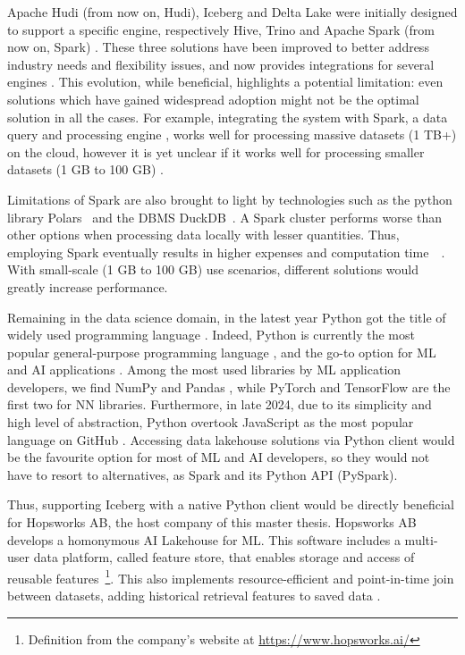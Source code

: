 Apache Hudi (from now on, Hudi), Iceberg and Delta Lake were initially designed to support a specific engine, respectively Hive, Trino and Apache Spark (from now on, Spark) \cite{ApacheHudiVs}. These three solutions have been improved to better address industry needs and flexibility issues, and now provides integrations for several engines \cite{OngoingEvolutionTableFormat}. This evolution, while beneficial, highlights a potential limitation: even solutions which have gained widespread adoption might not be the optimal solution in all the cases. For example, integrating the system with Spark, a data query and processing engine \cite{zahariaApacheSparkUnified2016}, works well for processing massive datasets (1 TB+) on the cloud, however it is yet unclear if it works well for processing smaller datasets (1 GB to 100 GB) \cite{Khazanchi1801362}. 

Limitations of Spark are also brought to light by technologies such as the python library Polars~\cite{vinkWroteOneFastest2021} and the \gls{DBMS} DuckDB~\cite{raasveldtDuckDBEmbeddableAnalytical2019}. A Spark cluster performs worse than other options when processing data locally with lesser quantities. Thus, employing Spark eventually results in higher expenses and computation time~\cite{ebergenUpdatesH2OAi2023}~\cite{BenchmarkResultsSpark}. With small-scale (1 GB to 100 GB) use scenarios, different solutions would greatly increase performance.

Remaining in the data science domain, in the latest year Python got the title of widely used programming language \cite{nagpalPythonDataAnalytics2019}. Indeed, Python is currently the most popular general-purpose programming language \cite{TIOBEIndex, StackOverflowDeveloper}, and the go-to option for \gls{ML} and \gls{AI} applications \cite{python-machine-learning}. Among the most used libraries by \gls{ML} application developers, we find NumPy and Pandas \cite{StackOverflowDeveloper}, while PyTorch and TensorFlow are the first two for \gls{NN} libraries. Furthermore, in late 2024, due to its simplicity and high level of abstraction, Python overtook JavaScript as the most popular language on GitHub \cite{PythonTopLanguage}. Accessing data lakehouse solutions via Python client would be the favourite option for most of \gls{ML} and \gls{AI} developers, so they would not have to resort to alternatives, as Spark and its Python \gls{API} (PySpark). 

Thus, supporting Iceberg with a native Python client would be directly beneficial for Hopsworks \gls{AB}, the host company of this master thesis. Hopsworks \gls{AB} develops a homonymous AI Lakehouse for \gls{ML}. This software includes a multi-user data platform, called feature store, that enables storage and access of reusable features~\footnote{Definition from the company's website at \url{https://www.hopsworks.ai/}}. This also implements resource-efficient and point-in-time join between datasets, adding historical retrieval features to saved data \cite{Pettersson1695672}.

